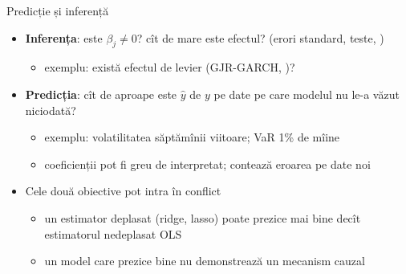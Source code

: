 \begin{frame}{Predicție și inferență}
\itemsize{\small}
\begin{itemize}
    \item \textbf{Inferența}: este $\beta_j \ne 0$? cît de mare este efectul? (erori standard, teste, )
    \begin{itemize}
        \item exemplu: există efectul de levier (GJR-GARCH, )?
    \end{itemize}
    \item \textbf{Predicția}: cît de aproape este $\hat y$ de $y$ pe date pe care modelul nu le-a văzut niciodată?
    \begin{itemize}
        \item exemplu: volatilitatea săptămînii viitoare; VaR 1\% de mîine
        \item coeficienții pot fi greu de interpretat; contează eroarea pe date noi
    \end{itemize}
    \item Cele două obiective pot intra în conflict
    \begin{itemize}
        \item un estimator deplasat (ridge, lasso) poate prezice mai bine decît estimatorul nedeplasat OLS
        \item un model care prezice bine nu demonstrează un mecanism cauzal
    \end{itemize}
\end{itemize}
\end{frame}

